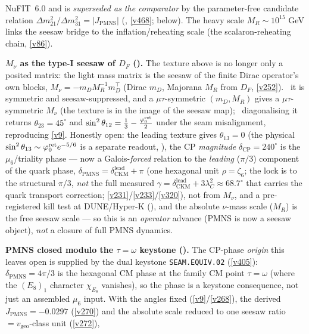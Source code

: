 NuFIT~6.0 and is \emph{superseded as the comparator} by the parameter-free candidate relation
$\Delta m^2_{21}/\Delta m^2_{31}=|J_{\mathrm{PMNS}}|$ (\mO, \vref{v468}; below). The heavy scale $M_R\sim10^{15}$ GeV links the seesaw bridge to the
inflation/reheating scale (the scalaron-reheating chain, \vref{v86}).
\par\smallskip\noindent\textbf{$M_\nu$ as the type-I seesaw of $D_F$ ().}
The texture above is no longer only a posited matrix: the light mass matrix is the seesaw of the finite
Dirac operator's own blocks, $M_\nu=-m_D M_R^{-1} m_D^\top$ (Dirac $m_D$, Majorana $M_R$ from $D_F$,
\vref{v252}). \mE\ it is symmetric and seesaw-suppressed, and a $\mu\tau$-symmetric $(m_D,M_R)$ gives a
$\mu\tau$-symmetric $M_\nu$ (the texture is in the image of the seesaw map); \mC\ diagonalising it returns
$\theta_{23}=45^\circ$ and $\sin^2\theta_{12}=\tfrac13-\tfrac{\varphi_0^{\mathrm{ret}}}{2}$ under the seam misalignment,
reproducing \vref{v9}. Honestly open: the leading texture gives $\theta_{13}=0$ (the physical
$\sin^2\theta_{13}\sim\varphi_0^{\mathrm{ret}} e^{-5/6}$ is a separate readout, \mO), the CP \emph{magnitude}
$\delta_{\mathrm{CP}}=240^\circ$ is the $\mu_6$/triality phase --- now a Galois-\emph{forced} relation to the
\emph{leading} ($\pi/3$) component of the quark phase, $\delta_{\mathrm{PMNS}}=\delta_{\mathrm{CKM}}^{\mathrm{lead}}+\pi$
(one hexagonal unit $\rho=\zeta_6$; the lock is to the structural $\pi/3$, \emph{not} the full measured
$\gamma=\delta_{\mathrm{CKM}}^{\mathrm{lead}}+3\lambda_C^2\approx68.7^\circ$ that carries the quark transport
correction; \vref{v231}/\vref{v233}/\vref{v320}), not from $M_\nu$, and a pre-registered kill test at
DUNE/Hyper-K (\mX),
and the absolute $\nu$-mass scale ($M_R$) is the free seesaw scale --- so this is an \emph{operator}
advance (PMNS is now a seesaw object), \emph{not} a closure of full PMNS dynamics.
\par\smallskip\noindent\textbf{PMNS closed modulo the $\tau{=}\omega$ keystone ().}
The CP-phase \emph{origin} this leaves open is supplied by the dual keystone \texttt{SEAM.EQUIV.02} (\vref{v405}):
$\delta_{\mathrm{PMNS}}=4\pi/3$ is the hexagonal CM phase at the family CM point $\tau{=}\omega$ (where the
$(E_8)_1$ character $\chi_{E_8}$ vanishes), so the phase is a keystone consequence, not just an assembled
$\mu_6$ input. With the angles fixed (\vref{v9}/\vref{v268}), the derived $J_{\mathrm{PMNS}}=-0.0297$
(\vref{v270}) and the absolute scale reduced to one seesaw ratio $=v_{\mathrm{geo}}$-class unit (\vref{v272}),

